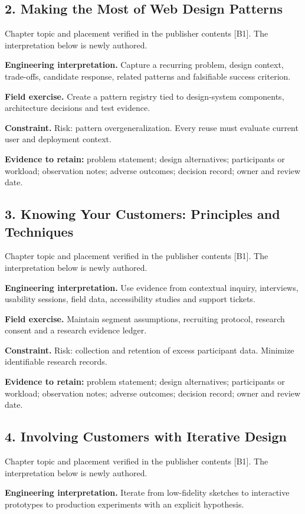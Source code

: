 \documentclass[11pt]{article}
\begin{document}
\subsection{2. Making the Most of Web Design Patterns}
\begin{groundedbox}Chapter topic and placement verified in the publisher contents [B1]. The interpretation below is newly authored.\end{groundedbox}
\textbf{Engineering interpretation.} Capture a recurring problem, design context, trade-offs, candidate response, related patterns and falsifiable success criterion.

\textbf{Field exercise.} Create a pattern registry tied to design-system components, architecture decisions and test evidence.

\textbf{Constraint.} Risk: pattern overgeneralization. Every reuse must evaluate current user and deployment context.

\textbf{Evidence to retain:} problem statement; design alternatives; participants or workload; observation notes; adverse outcomes; decision record; owner and review date.

\subsection{3. Knowing Your Customers: Principles and Techniques}
\begin{groundedbox}Chapter topic and placement verified in the publisher contents [B1]. The interpretation below is newly authored.\end{groundedbox}
\textbf{Engineering interpretation.} Use evidence from contextual inquiry, interviews, usability sessions, field data, accessibility studies and support tickets.

\textbf{Field exercise.} Maintain segment assumptions, recruiting protocol, research consent and a research evidence ledger.

\textbf{Constraint.} Risk: collection and retention of excess participant data. Minimize identifiable research records.

\textbf{Evidence to retain:} problem statement; design alternatives; participants or workload; observation notes; adverse outcomes; decision record; owner and review date.

\subsection{4. Involving Customers with Iterative Design}
\begin{groundedbox}Chapter topic and placement verified in the publisher contents [B1]. The interpretation below is newly authored.\end{groundedbox}
\textbf{Engineering interpretation.} Iterate from low-fidelity sketches to interactive prototypes to production experiments with an explicit hypothesis.
\end{document}
